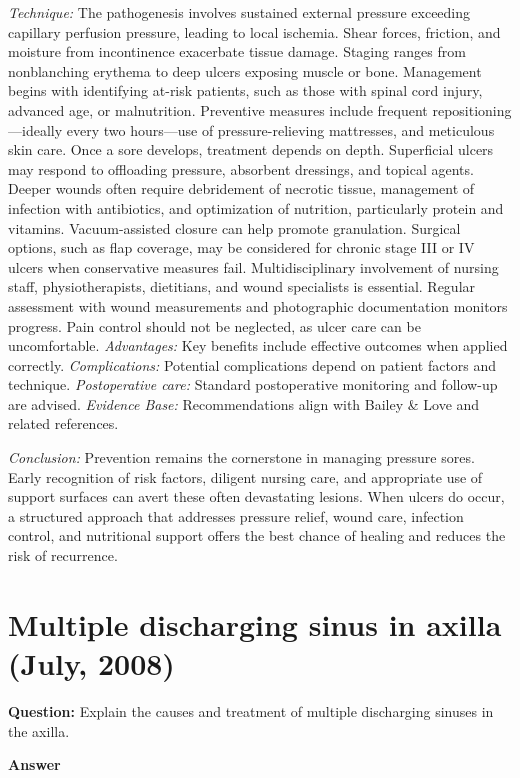 \documentclass{article}
\begin{document}
\emph{Technique:} The pathogenesis involves sustained external pressure exceeding capillary perfusion pressure, leading to local ischemia. Shear forces, friction, and moisture from incontinence exacerbate tissue damage. Staging ranges from nonblanching erythema to deep ulcers exposing muscle or bone. Management begins with identifying at-risk patients, such as those with spinal cord injury, advanced age, or malnutrition. Preventive measures include frequent repositioning—ideally every two hours—use of pressure-relieving mattresses, and meticulous skin care. Once a sore develops, treatment depends on depth. Superficial ulcers may respond to offloading pressure, absorbent dressings, and topical agents. Deeper wounds often require debridement of necrotic tissue, management of infection with antibiotics, and optimization of nutrition, particularly protein and vitamins. Vacuum-assisted closure can help promote granulation. Surgical options, such as flap coverage, may be considered for chronic stage III or IV ulcers when conservative measures fail. Multidisciplinary involvement of nursing staff, physiotherapists, dietitians, and wound specialists is essential. Regular assessment with wound measurements and photographic documentation monitors progress. Pain control should not be neglected, as ulcer care can be uncomfortable.
\emph{Advantages:} Key benefits include effective outcomes when applied correctly.
\emph{Complications:} Potential complications depend on patient factors and technique.
\emph{Postoperative care:} Standard postoperative monitoring and follow-up are advised.
\emph{Evidence Base:} Recommendations align with Bailey & Love and related references.

\emph{Conclusion:} Prevention remains the cornerstone in managing pressure sores. Early recognition of risk factors, diligent nursing care, and appropriate use of support surfaces can avert these often devastating lesions. When ulcers do occur, a structured approach that addresses pressure relief, wound care, infection control, and nutritional support offers the best chance of healing and reduces the risk of recurrence.


\section{Multiple discharging sinus in axilla (July, 2008)}

\textbf{Question:} Explain the causes and treatment of multiple discharging sinuses in the axilla.

\textbf{Answer}
\end{document}
